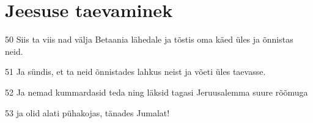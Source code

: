 \section*{Jeesuse taevaminek}

\par 50 Siis ta viis nad välja Betaania lähedale ja tõstis oma käed üles ja õnnistas neid.
\par 51 Ja sündis, et ta neid õnnistades lahkus neist ja võeti üles taevasse.
\par 52 Ja nemad kummardasid teda ning läksid tagasi Jeruusalemma suure rõõmuga
\par 53 ja olid alati pühakojas, tänades Jumalat!






